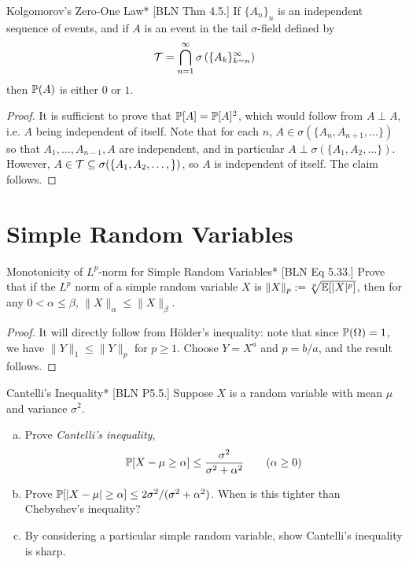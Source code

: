 \begin{problem}{Kolgomorov's Zero-One Law}*
    [BLN Thm 4.5.] If \(\{A_n\}_n\) is an independent sequence of events, and if \(A\) is an event in the tail \(\sigma\)-field defined by
    \[
        \mathcal{T} = \bigcap_{n=1}^\infty \sigma \left( \{A_k\}_{k=n}^\infty \right)
    \]
    then \(\mathbb{P}(A)\) is either \(0\) or \(1\).
\end{problem}

\begin{proof}
    It is sufficient to prove that \(\mathbb{P}[A] = \mathbb{P}[A]^2\), which would follow from \(A \perp A\), i.e. \(A\) being independent of itself. Note that for each \(n\), \(A \in \sigma(\{A_n, A_{n+1}, \dots\})\) so that \(A_1, \dots, A_{n-1}, A\) are independent, and in particular \(A \perp \sigma(\{A_1, A_2, \dots \})\). However, \(A \in \mathcal{T} \subseteq \sigma(\{A_1, A_2, \dots, \})\), so \(A\) is independent of itself. The claim follows. 
\end{proof}



\newpage
\section{Simple Random Variables}


\begin{problem}{Monotonicity of \(L^p\)-norm for Simple Random Variables}*
    [BLN Eq 5.33.] Prove that if the \(L^p\) norm of a simple random variable \(X\) is \(\|X\|_p := \sqrt[p]{\mathbb{E}[|X|^p]}\), then for any \(0 < \alpha \leq \beta\), \(\|X\|_\alpha \leq \|X\|_\beta\).
\end{problem}


\begin{proof}
    It will directly follow from H\"older's inequality: note that since \(\mathbb{P}(\Omega) = 1\), we have \(\|Y\|_1 \leq \|Y\|_p\) for \(p \geq 1\). Choose \(Y = X^a\) and \(p = b/a\), and the result follows.
\end{proof}


\begin{problem}{Cantelli's Inequality}*
    [BLN P5.5.] Suppose \(X\) is a random variable with mean \(\mu\) and variance \(\sigma^2\).
    \begin{enumerate}[(a)]
        \itemsep0em
        \item Prove \emph{Cantelli's inequality},
        \[
            \mathbb{P}[X - \mu \geq \alpha] \leq \frac{\sigma^2}{\sigma^2 + \alpha^2}
            \qquad (\alpha \geq 0)
        \]
        \item Prove \(\mathbb{P}[|X - \mu| \geq \alpha] \leq 2\sigma^2 / (\sigma^2 + \alpha^2)\). When is this tighter than Chebyshev's inequality?
        \item By considering a particular simple random variable, show Cantelli's inequality is sharp.
    \end{enumerate}
\end{problem}

